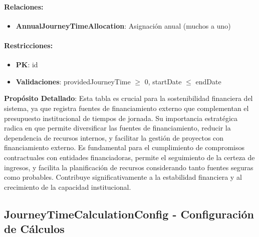\documentclass[11pt,a4paper]{article}
\begin{document}
\paragraph{Relaciones:}
\begin{itemize}
    \item \textbf{AnnualJourneyTimeAllocation}: Asignación anual (muchos a uno)
\end{itemize}

\paragraph{Restricciones:}
\begin{itemize}
    \item \textbf{PK}: id
    \item \textbf{Validaciones}: providedJourneyTime $\geq$ 0, startDate $\leq$ endDate
\end{itemize}

\vspace{0.5cm}

\textbf{Propósito Detallado}: Esta tabla es crucial para la sostenibilidad financiera del sistema, ya que registra fuentes de financiamiento externo que complementan el presupuesto institucional de tiempos de jornada. Su importancia estratégica radica en que permite diversificar las fuentes de financiamiento, reducir la dependencia de recursos internos, y facilitar la gestión de proyectos con financiamiento externo. Es fundamental para el cumplimiento de compromisos contractuales con entidades financiadoras, permite el seguimiento de la certeza de ingresos, y facilita la planificación de recursos considerando tanto fuentes seguras como probables. Contribuye significativamente a la estabilidad financiera y al crecimiento de la capacidad institucional.

{\color{darkblue}\Large\subsection{JourneyTimeCalculationConfig - Configuración de Cálculos}}
\end{document}
